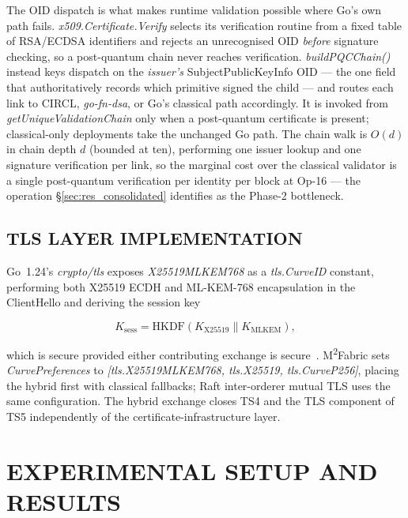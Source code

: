 \documentclass{ieeetj}
\newcommand{\mfabric}{M\textsuperscript{2}Fabric}
\begin{document}
The OID dispatch is what makes runtime validation possible where Go's
own path fails. \textit{x509.Certificate.Verify} selects its
verification routine from a fixed table of RSA/ECDSA identifiers and
rejects an unrecognised OID \emph{before} signature checking, so a
post-quantum chain never reaches verification. \textit{buildPQCChain()}
instead keys dispatch on the \emph{issuer's} SubjectPublicKeyInfo OID
--- the one field that authoritatively records which primitive signed
the child --- and routes each link to CIRCL, \textit{go-fn-dsa}, or
Go's classical path accordingly. It is invoked from
\textit{getUniqueValidationChain} only when a post-quantum certificate
is present; classical-only deployments take the unchanged Go path. The
chain walk is $O(d)$ in chain depth $d$ (bounded at ten), performing one
issuer lookup and one signature verification per link, so the marginal
cost over the classical validator is a single post-quantum verification
per identity per block at Op-16 --- the operation
\S\ref{sec:res_consolidated} identifies as the Phase-2 bottleneck.

\subsection{TLS LAYER IMPLEMENTATION}
\label{sec:method_tls}

Go~1.24's \textit{crypto/tls} exposes \textit{X25519MLKEM768} as a
\textit{tls.CurveID} constant, performing both X25519 ECDH and
ML-KEM-768 encapsulation in the ClientHello and deriving the session key

\begin{equation}
K_{\mathrm{sess}} = \mathrm{HKDF}(K_{\mathrm{X25519}}\|K_{\mathrm{MLKEM}}),
\label{eq:hybrid_key}
\end{equation}

which is secure provided either contributing exchange is
secure~\cite{ietf_hybrid_tls, ietf_x25519mlkem768, barker2020transition, bindel2017}.
\mfabric{} sets \textit{CurvePreferences} to
\textit{[tls.X25519MLKEM768, tls.X25519, tls.CurveP256]}, placing the
hybrid first with classical fallbacks; Raft inter-orderer mutual TLS uses
the same configuration. The hybrid exchange closes TS4 and the TLS
component of TS5 independently of the certificate-infrastructure layer.

\section{EXPERIMENTAL SETUP AND RESULTS} \label{sec:experimental}
\end{document}
